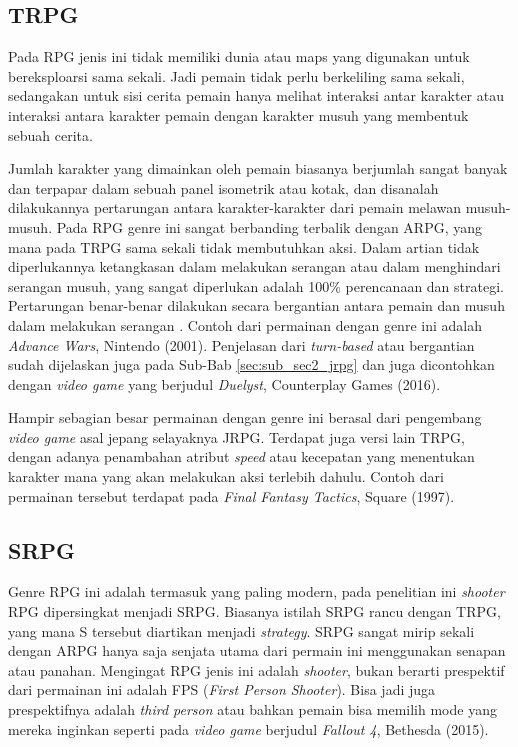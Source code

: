 \begin{subs}
	\subsection{TRPG}
	\label{sec:sub_sec2_trpg}
	
	Pada RPG jenis ini tidak memiliki dunia atau maps yang digunakan untuk bereksploarsi sama sekali. Jadi pemain tidak perlu berkeliling sama sekali, sedangakan untuk sisi cerita pemain hanya melihat interaksi antar karakter atau interaksi antara karakter pemain dengan karakter musuh yang membentuk sebuah cerita.
	\vspace{1ex}
	
	Jumlah karakter yang dimainkan oleh pemain biasanya berjumlah sangat banyak dan terpapar dalam sebuah panel isometrik atau kotak, dan disanalah dilakukannya pertarungan antara karakter-karakter dari pemain melawan musuh-musuh. Pada RPG genre ini sangat berbanding terbalik dengan ARPG, yang mana pada TRPG sama sekali tidak membutuhkan aksi. Dalam artian tidak diperlukannya ketangkasan dalam melakukan serangan atau dalam menghindari serangan musuh, yang sangat diperlukan adalah 100\% perencanaan dan strategi. Pertarungan benar-benar dilakukan secara bergantian antara pemain dan musuh dalam melakukan serangan \citep{moore2016}. Contoh dari permainan dengan genre ini adalah \textit{Advance Wars}, Nintendo (2001). Penjelasan dari \textit{turn-based} atau bergantian sudah dijelaskan juga pada Sub-Bab \ref{sec:sub_sec2_jrpg} dan juga dicontohkan dengan \textit{video game} yang berjudul \textit{Duelyst}, Counterplay Games (2016).
	\vspace{1ex}
	
	Hampir sebagian besar permainan dengan genre ini berasal dari pengembang \textit{video game} asal jepang selayaknya JRPG. Terdapat juga versi lain TRPG, dengan adanya penambahan atribut \textit{speed} atau kecepatan yang menentukan karakter mana yang akan melakukan aksi terlebih dahulu. Contoh dari permainan tersebut terdapat pada \textit{Final Fantasy Tactics}, Square (1997).
	\vspace{1ex}
	
	\subsection{SRPG}
	\label{sec:sub_sec2_srpg}
	
	Genre RPG ini adalah termasuk yang paling modern, pada penelitian ini \textit{shooter} RPG dipersingkat menjadi SRPG. Biasanya istilah SRPG rancu dengan TRPG, yang mana S tersebut diartikan menjadi \textit{strategy}. SRPG sangat mirip sekali dengan ARPG hanya saja senjata utama dari permain ini menggunakan senapan atau panahan. Mengingat RPG jenis ini adalah \textit{shooter}, bukan berarti prespektif dari permainan ini adalah FPS (\textit{First Person Shooter}). Bisa jadi juga prespektifnya adalah \textit{third person} atau bahkan pemain bisa memilih mode yang mereka inginkan seperti pada \textit{video game} berjudul \textit{Fallout 4}, Bethesda (2015).
	\vspace{1ex}
	

\end{subs}
